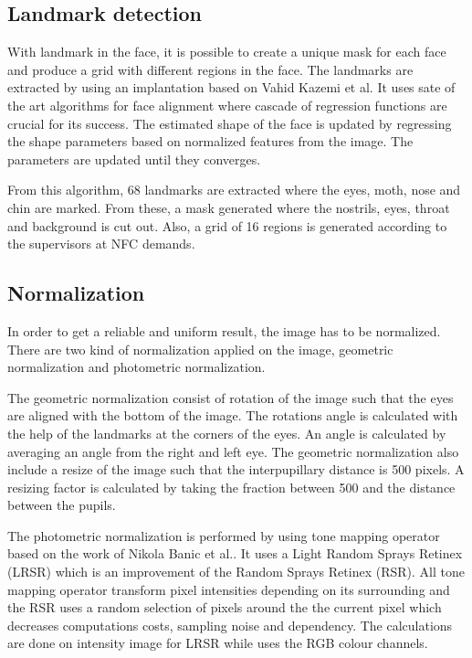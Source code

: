 \subsection{Landmark detection}

With landmark in the face, it is possible to create a unique mask for each face and produce a grid with different regions in the face. The landmarks are extracted by using an implantation based on Vahid Kazemi et al.\cite{dlib_landmark} It uses sate of the art algorithms for face alignment where cascade of regression functions are crucial for its success. The estimated shape of the face is updated by regressing the shape parameters based on normalized features from the image. The parameters are updated until they converges.  

From this algorithm, 68 landmarks are extracted where the eyes, moth, nose and chin are marked. From these, a mask generated where the nostrils, eyes, throat and background is cut out. Also, a grid of 16 regions is generated according to the supervisors at NFC demands. 

\subsection{Normalization}

In order to get a reliable and uniform result, the image has to be normalized. There are two kind of normalization applied on the image, geometric normalization and photometric normalization.  

The geometric normalization consist of rotation of the image such that the eyes are aligned with the bottom of the image. The rotations angle is calculated with the help of the landmarks at the corners of the eyes. An angle is calculated by averaging an angle from the right and left eye. The geometric normalization also include a resize of the image such that the interpupillary distance is 500 pixels. A resizing factor is calculated by taking the fraction between 500 and the distance between the pupils.         

The photometric normalization is performed by using tone mapping operator based on the work of Nikola Banic et al.\cite{badger}. It uses a Light Random Sprays Retinex (LRSR) which is an improvement of the Random Sprays Retinex (RSR)\cite{RSR}. All tone mapping operator transform pixel intensities depending on its surrounding and the RSR uses a random selection of pixels around the the current pixel which decreases computations costs, sampling noise and dependency. The calculations are done on intensity image for LRSR while uses the RGB colour channels.
         
